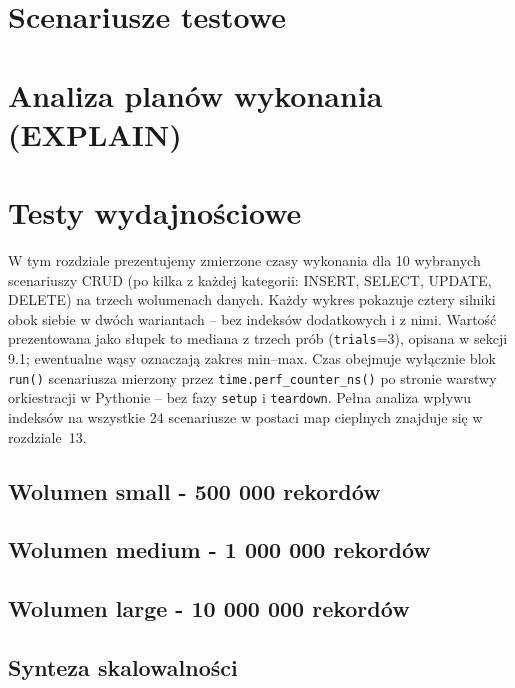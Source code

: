 \documentclass{template}
\begin{document}
\section{Scenariusze testowe}


\section{Analiza planów wykonania (EXPLAIN)}



\section{Testy wydajnościowe}

W tym rozdziale prezentujemy zmierzone czasy wykonania dla 10 wybranych
scenariuszy CRUD (po kilka z każdej kategorii: INSERT, SELECT, UPDATE,
DELETE) na trzech wolumenach danych. Każdy wykres pokazuje cztery
silniki obok siebie w dwóch wariantach -- bez indeksów dodatkowych
i z nimi. Wartość prezentowana jako słupek to mediana z trzech prób
(\texttt{trials}=3), opisana w sekcji 9.1; ewentualne wąsy oznaczają
zakres min--max. Czas obejmuje wyłącznie blok \texttt{run()} scenariusza
mierzony przez \texttt{time.perf\_counter\_ns()} po stronie warstwy
orkiestracji w Pythonie -- bez fazy \texttt{setup} i \texttt{teardown}.
Pełna analiza wpływu indeksów na wszystkie 24 scenariusze w postaci
map cieplnych znajduje się w rozdziale~13.

\subsection{Wolumen small - 500 000 rekordów}


\subsection{Wolumen medium - 1 000 000 rekordów}


\subsection{Wolumen large - 10 000 000 rekordów}


\subsection{Synteza skalowalności}
\end{document}

